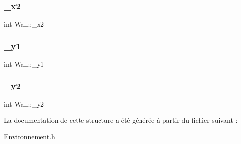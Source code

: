 \subsubsection{\texorpdfstring{\+\_\+x2}{\_x2}}
{\footnotesize\ttfamily int Wall\+::\+\_\+x2}

\mbox{\label{structWall_aa79f9d9da68a74b10ceaf988c8d46a5e}} 
\subsubsection{\texorpdfstring{\+\_\+y1}{\_y1}}
{\footnotesize\ttfamily int Wall\+::\+\_\+y1}

\mbox{\label{structWall_a8a362d4ca002122ba47b2d06d770bcd1}} 
\subsubsection{\texorpdfstring{\+\_\+y2}{\_y2}}
{\footnotesize\ttfamily int Wall\+::\+\_\+y2}



La documentation de cette structure a été générée à partir du fichier suivant \+:\begin{DoxyCompactItemize}
\item 
\hyperlink{Environnement_8h}{Environnement.\+h}\end{DoxyCompactItemize}
